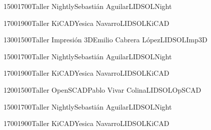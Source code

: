 \documentclass[a4paper,10pt]{report}
\begin{document}
\begin{landscape}
\begin{timetable}
     
        {1500}{1700}{Taller Nightly}{Sebasti\'{a}n Aguilar}{{\tiny LIDSOL}}{Night}
   
     {1700}{1900}{Taller KiCAD}{Yesica Navarro}{{\tiny LIDSOL}}{KiCAD}
   
   
   
   
 
   {1300}{1500}{Taller Impresión 3D}{Emilio Cabrera L\'{o}pez}{{\tiny LIDSOL}}{Imp3D}
  
   {1500}{1700}{Taller Nightly}{Sebasti\'{a}n Aguilar}{{\tiny LIDSOL}}{Night}
  
   {1700}{1900}{Taller KiCAD}{Yesica Navarro}{{\tiny LIDSOL}}{KiCAD}
   
   
   
   
   
   
    {1200}{1500}{Taller OpenSCAD}{Pablo Vivar Colina}{{\tiny LIDSOL}}{OpSCAD}
   
    
     {1500}{1700}{Taller Nightly}{Sebasti\'{a}n Aguilar}{{\tiny LIDSOL}}{Night}
    
     {1700}{1900}{Taller KiCAD}{Yesica Navarro}{{\tiny LIDSOL}}{KiCAD}
   
   
   
   
   


 
 
   
     
   
   
   
  
   
  
  
    
   
 \end{timetable}
 \end{landscape}
 
\end{document}
